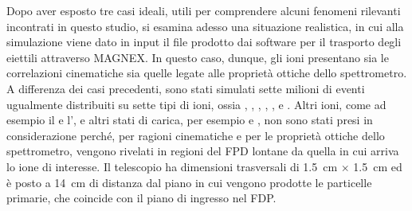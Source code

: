 
Dopo aver esposto tre casi ideali, utili per comprendere alcuni fenomeni rilevanti incontrati in questo studio, si esamina adesso una situazione realistica, in cui alla simulazione \geant{} viene dato in input il file prodotto dai software per il trasporto degli eiettili attraverso MAGNEX.
In questo caso, dunque, gli ioni presentano sia le correlazioni cinematiche sia quelle legate alle proprietà ottiche dello spettrometro.
A differenza dei casi precedenti, sono stati simulati sette milioni di eventi ugualmente distribuiti su sette tipi di ioni, ossia , , , , ,  e .
Altri ioni, come ad esempio il  e l', e altri stati di carica, per esempio  e , non sono stati presi in considerazione perché, per ragioni cinematiche e per le proprietà ottiche dello spettrometro, vengono rivelati in regioni del FPD lontane da quella in cui arriva lo ione di interesse.
Il telescopio ha dimensioni trasversali di 1.5~cm $\times$ 1.5~cm ed è posto a 14~cm di distanza dal piano in cui vengono prodotte le particelle primarie, che coincide con il piano di ingresso nel FDP.



